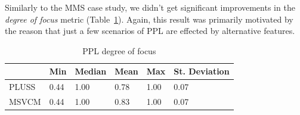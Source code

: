 \documentclass{sig-alternate}
\begin{document}





Similarly to the MMS case study, we
didn't get significant improvements in the \emph{degree of focus} metric
(Table~\ref{tab:ppl-dof}). Again, this result was primarily motivated by the
reason that just a few scenarios of PPL are effected by alternative features. 

\begin{table}[htb] \centering
\caption{PPL degree of focus}
\label{tab:ppl-dof}
\begin{small}
\begin{tabular}{llllll} \hline
					& Min 	& Median 	& Mean 	& Max 	& St. Deviation \\ \hline
	PLUSS			& 0.44	& 1.00		& 0.78	& 1.00	& 0.07			\\
	MSVCM			& 0.44  & 1.00  	& 0.83 	& 1.00 	& 0.07			\\ \hline	
\end{tabular}
\end{small}
\end{table}
\end{document}
